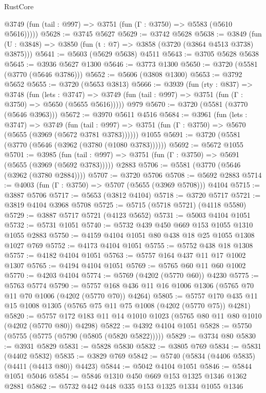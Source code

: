 \begin{lexlean}{RustCore}
\begin{coremodule}
      @3749 (fun (tail : @997) => @3751 (fun (Γ : @3750) => @5583 (@5610 @5616)))))
@5628 := @3745 @5627
@5629 := @3742 @5628
@5638 := @3849 (fun (U : @3848) => @3850 (fun (t : @7) => @3858 (@3720 (@3864 @4513 @3738) @3875)))
@5641 := @5603 (@5629 @5638) @4511
@5643 := @3705 @5628 @5638
@5645 := @3936 @5627 @1300
@5646 := @3773 @1300
@5650 := @3720 (@5581 (@3770 (@5646 @3786)))
@5652 := @5606 (@3808 @1300)
@5653 := @3792 @5652
@5655 := @3720 (@5653 @3813)
@5666 := @3939
    (fun (rty : @837) =>
    @3748
      (fun (lets : @3747) =>
      @3749 (fun (tail : @997) => @3751 (fun (Γ : @3750) => @5650 (@5655 @5616)))))
    @979
@5670 := @3720 (@5581 (@3770 (@5646 @3963)))
@5672 := @3970 @5611 @4516
@5684 := @3961
    (fun (lets : @3747) =>
    @3749
      (fun (tail : @997) => @3751 (fun (Γ : @3750) => @5670 (@5655 (@3969 (@5672 @3781 @3783))))))
    @1055
@5691 := @3720 (@5581 (@3770 (@5646 (@3962 (@3780 (@1080 @3783))))))
@5692 := @5672 @1055
@5701 := @3985
    (fun (tail : @997) => @3751 (fun (Γ : @3750) => @5691 (@5655 (@3969 (@5692 @3783)))))
    @2883
@5706 := @5581 (@3770 (@5646 (@3962 (@3780 @2884))))
@5707 := @3720 @5706
@5708 := @5692 @2883
@5714 := @4003 (fun (Γ : @3750) => @5707 (@5655 (@3969 @5708))) @4104
@5715 := @3887 @5706
@5717 := @5653 (@3812 @4104)
@5718 := @3720 @5717
@5721 := @3819 @4104 @3968 @5708
@5725 := @5715 (@5718 @5721) (@4118 @5580)
@5729 := @3887 @5717 @5721 (@4123 @5652)
@5731 := @5003 @4104 @1051
@5732 := @5731 @1051
@5740 := @5732 @439 @450 @669 @153 @1055 @1310 @1055 @2883
@5750 := @4159 @4104 @1051 @80 @438 @18 @25 @1055 @1308 @1027 @769
@5752 := @4173 @4104 @1051
@5755 := @5752 @438 @18 @1308
@5757 := @4182 @4104 @1051
@5763 := @5757 @164 @437 @11 @17 @1002 @1307
@5765 := @4194 @4104 @1051
@5769 := @5765 @60 @11 @60 @1002
@5770 := @4203 @4104
@5774 := @5769 (@4202 (@5770 @60)) @4230
@5775 := @5763 @5774
@5790 := @5757 @168 @436 @11 @16 @1006 @1306 (@5765 @70 @11 @70 @1006 (@4202 (@5770 @70)) @4264)
@5805 := @5757 @170 @435 @11 @15 @1008 @1305 (@5765 @75 @11 @75 @1008 (@4202 (@5770 @75)) @4281)
@5820 := @5757 @172 @183 @11 @14 @1010 @1023 (@5765 @80 @11 @80 @1010 (@4202 (@5770 @80)) @4298)
@5822 := @4392 @4104 @1051
@5828 := @5750 (@5755 (@5775 (@5790 (@5805 (@5820 @5822)))))
@5829 := @3734 @80
@5830 := @3931 @5829
@5831 := @5828 @5830
@5832 := @3805 @769
@5834 := @5831 (@4402 @5832)
@5835 := @3829 @769
@5842 := @5740 (@5834 (@4406 @5835) (@4411 (@4413 @80)) @4423)
@5844 := @5042 @4104 @1051
@5846 := @5844 @1051 @5046
@5854 := @5846 @1310 @450 @669 @153 @1325 @1346 @1362 @2881
@5862 := @5732 @442 @448 @335 @153 @1325 @1334 @1055 @1346

\end{coremodule}
\end{lexlean}
